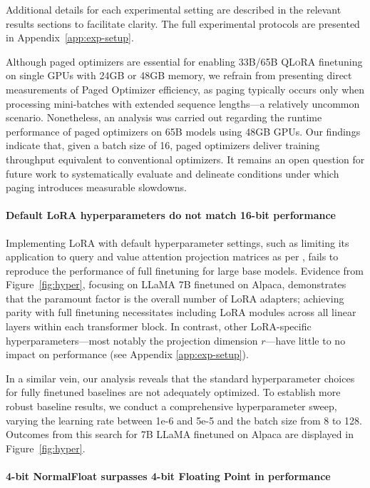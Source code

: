 Additional details for each experimental setting are described in the relevant results sections to facilitate clarity. The full experimental protocols are presented in Appendix~\ref{app:exp-setup}.

Although paged optimizers are essential for enabling 33B/65B \textsc{QLoRA} finetuning on single GPUs with 24GB or 48GB memory, we refrain from presenting direct measurements of Paged Optimizer efficiency, as paging typically occurs only when processing mini-batches with extended sequence lengths—a relatively uncommon scenario. Nonetheless, an analysis was carried out regarding the runtime performance of paged optimizers on 65B models using 48GB GPUs. Our findings indicate that, given a batch size of 16, paged optimizers deliver training throughput equivalent to conventional optimizers. It remains an open question for future work to systematically evaluate and delineate conditions under which paging introduces measurable slowdowns.

\paragraph{Default LoRA hyperparameters do not match 16-bit performance}

Implementing LoRA with default hyperparameter settings, such as limiting its application to query and value attention projection matrices as per \citep{hu2021lora}, fails to reproduce the performance of full finetuning for large base models. Evidence from Figure~\ref{fig:hyper}, focusing on LLaMA 7B finetuned on Alpaca, demonstrates that the paramount factor is the overall number of LoRA adapters; achieving parity with full finetuning necessitates including LoRA modules across all linear layers within each transformer block. In contrast, other LoRA-specific hyperparameters—most notably the projection dimension $r$—have little to no impact on performance (see Appendix \ref{app:exp-setup}).

In a similar vein, our analysis reveals that the standard hyperparameter choices for fully finetuned baselines are not adequately optimized. To establish more robust baseline results, we conduct a comprehensive hyperparameter sweep, varying the learning rate between 1e-6 and 5e-5 and the batch size from 8 to 128. Outcomes from this search for 7B LLaMA finetuned on Alpaca are displayed in Figure~\ref{fig:hyper}.

\paragraph{4-bit NormalFloat surpasses 4-bit Floating Point in performance} 

